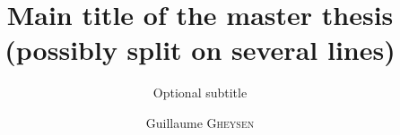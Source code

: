 \documentclass{src/1.Cover/EPL-master-thesis-covers-EN}
\title{Main title of the master thesis (possibly split on several lines)}
\subtitle{Optional subtitle}
\author{Guillaume \textsc{Gheysen}}
\begin{document}
	\maketitle
	
	\newpage
	\newpage
	
	\newpage
	\newpage
	\tableofcontents
	\listoffigures
  	\backcoverpage
\end{document}
